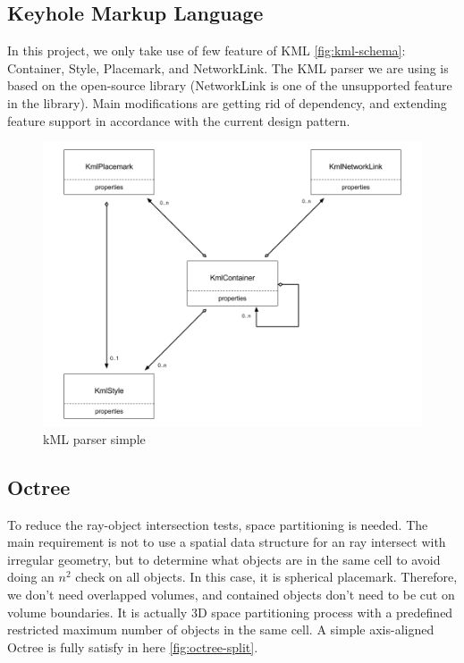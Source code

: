 \subsection{Keyhole Markup Language}
\label{section:kml}

In this project, we only take use of few feature of KML \ref{fig:kml-schema}: Container, Style, Placemark,  and NetworkLink. The KML parser we are using is based on the open-source library  \parencite{Google.code-kml.2016} (NetworkLink is one of the unsupported feature in the library). Main modifications are getting rid of  dependency, and extending  feature support in accordance with the current design pattern.

\begin{figure}[H]
\caption[kml-parser-simple]{kML parser simple}
\label{fig:kml-parser-simple}
\centering
\includegraphics[width=\linewidth]{Figures/kml-parser-simple.png}
\decoRule
\end{figure}

\subsection{Octree} 
\label{section:octree}

To reduce the ray-object intersection tests,  space partitioning is needed. The main requirement is not to use a spatial data structure for an ray intersect with irregular geometry, but to determine what objects are in the same cell to avoid doing an $n^2$ check on all objects. In this case, it is spherical placemark. Therefore, we don't need overlapped volumes, and contained objects don't need to be cut on volume boundaries. It is actually 3D space partitioning process with a predefined restricted maximum number of objects in the same cell. A simple axis-aligned Octree is fully satisfy in here \ref{fig:octree-split}.


